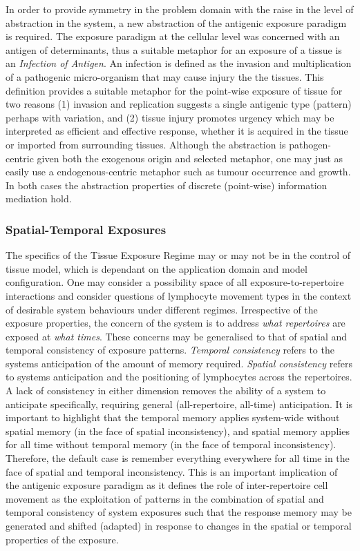 In order to provide symmetry in the problem domain with the raise in the level of abstraction in the system, a new abstraction of the antigenic exposure paradigm is required. The exposure paradigm at the cellular level was concerned with an antigen of determinants, thus a suitable metaphor for an exposure of a tissue is an \emph{Infection of Antigen}. An infection is defined as the invasion and multiplication of a pathogenic micro-organism that may cause injury the the tissues. This definition provides a suitable metaphor for the point-wise exposure of tissue for two reasons (1) invasion and replication suggests a single antigenic type (pattern) perhaps with variation, and (2) tissue injury promotes urgency which may be interpreted as efficient and effective response, whether it is acquired in the tissue or imported from surrounding tissues. Although the abstraction is pathogen-centric given both the exogenous origin and selected metaphor, one may just as easily use a endogenous-centric metaphor such as tumour occurrence and growth. In both cases the abstraction properties of discrete (point-wise) information mediation hold.

%
%
\subsubsection{Spatial-Temporal Exposures}
\label{subsec:tissues:paradigm:exposures:spatialtemporal}
The specifics of the Tissue Exposure Regime may or may not be in the control of tissue model, which is dependant on the application domain and model configuration. One may consider a possibility space of all exposure-to-repertoire interactions and consider questions of lymphocyte movement types in the context of desirable system behaviours under different regimes. Irrespective of the exposure properties, the concern of the system is to address \emph{what repertoires} are exposed at \emph{what times}. These concerns may be generalised to that of spatial and temporal consistency of exposure patterns. \emph{Temporal consistency} refers to the systems anticipation of the amount of memory required. \emph{Spatial consistency} refers to systems anticipation and the positioning of lymphocytes across the repertoires. A lack of consistency in either dimension removes the ability of a system to anticipate specifically, requiring general (all-repertoire, all-time) anticipation. It is important to highlight that the temporal memory applies system-wide without spatial memory (in the face of spatial inconsistency), and spatial memory applies for all time without temporal memory (in the face of temporal inconsistency). Therefore, the default case is remember everything everywhere for all time in the face of spatial and temporal inconsistency. This is an important implication of the antigenic exposure paradigm as it defines the role of inter-repertoire cell movement as the exploitation of patterns in the combination of spatial and temporal consistency of system exposures such that the response memory may be generated and shifted (adapted) in response to changes in the spatial or temporal properties of the exposure. 

